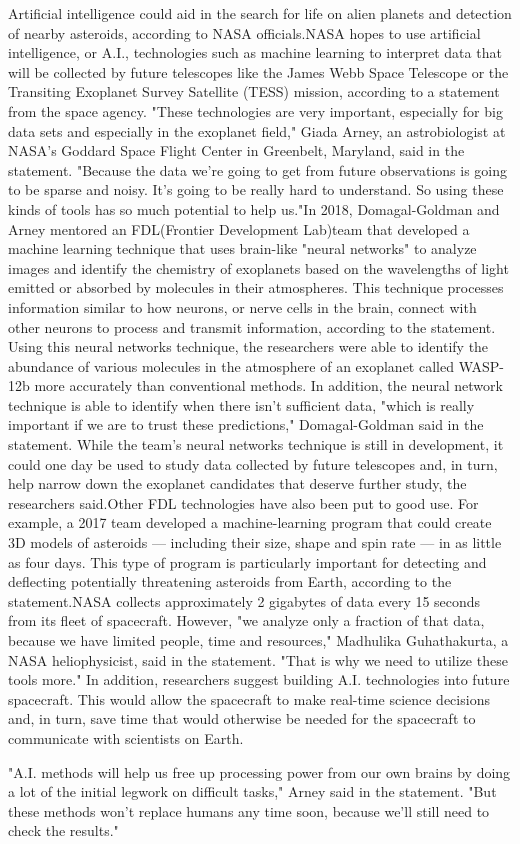 \documentclass{article}
\begin{document}
Artificial intelligence could aid in the search for life on alien planets and detection of nearby asteroids, according to NASA officials.NASA hopes to use artificial intelligence, or A.I., technologies such as machine learning to interpret data that will be collected by future telescopes like the James Webb Space Telescope or the Transiting Exoplanet Survey Satellite (TESS) mission, according to a statement from the space agency. "These technologies are very important, especially for big data sets and especially in the exoplanet field," Giada Arney, an astrobiologist at NASA's Goddard Space Flight Center in Greenbelt, Maryland, said in the statement. "Because the data we're going to get from future observations is going to be sparse and noisy. It's going to be really hard to understand. So using these kinds of tools has so much potential to help us."In 2018, Domagal-Goldman and Arney mentored an FDL(Frontier Development Lab)team that developed a machine learning technique that uses brain-like "neural networks" to analyze images and identify the chemistry of exoplanets based on the wavelengths of light emitted or absorbed by molecules in their atmospheres. This technique processes information similar to how neurons, or nerve cells in the brain, connect with other neurons to process and transmit information, according to the statement. Using this neural networks technique, the researchers were able to identify the abundance of various molecules in the atmosphere of an exoplanet called WASP-12b more accurately than conventional methods. In addition, the neural network technique is able to identify when there isn't sufficient data, "which is really important if we are to trust these predictions," Domagal-Goldman said in the statement. While the team's neural networks technique is still in development, it could one day be used to study data collected by future telescopes and, in turn, help narrow down the exoplanet candidates that deserve further study, the researchers said.Other FDL technologies have also been put to good use. For example, a 2017 team developed a machine-learning program that could create 3D models of asteroids — including their size, shape and spin rate — in as little as four days. This type of program is particularly important for detecting and deflecting potentially threatening asteroids from Earth, according to the statement.NASA collects approximately 2 gigabytes of data every 15 seconds from its fleet of spacecraft. However, "we analyze only a fraction of that data, because we have limited people, time and resources," Madhulika Guhathakurta, a NASA heliophysicist, said in the statement. "That is why we need to utilize these tools more."
In addition, researchers suggest building A.I. technologies into future spacecraft. This would allow the spacecraft to make real-time science decisions and, in turn, save time that would otherwise be needed for the spacecraft to communicate with scientists on Earth.

"A.I. methods will help us free up processing power from our own brains by doing a lot of the initial legwork on difficult tasks," Arney said in the statement. "But these methods won't replace humans any time soon, because we'll still need to check the results." 
\end{document}
